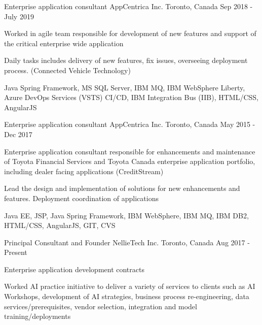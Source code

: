 \begin{cventries}


  \cventry
    {Enterprise application consultant}
    {AppCentrica Inc.}
    {Toronto, Canada}
    {Sep 2018 - July 2019}
    {
      \begin{cvitems}
      	\item{Worked in agile team responsible for development of new features and support of the critical enterprise wide application }
      	\item{ Daily tasks includes delivery of new features, fix issues, overseeing deployment process.  (Connected Vehicle Technology)}
       \item {Java Spring Framework, MS SQL Server, IBM MQ, IBM WebSphere Liberty, Azure DevOps Services (VSTS) CI/CD, IBM Integration Bus (IIB), HTML/CSS, AngularJS}
      \end{cvitems}
    }
    


  \cventry
    {Enterprise application consultant}
    {AppCentrica Inc.}
    {Toronto, Canada}
    {May 2015 - Dec 2017}
    {
      \begin{cvitems}
      	\item{Enterprise application consultant responsible for enhancements and maintenance of Toyota Financial Services and Toyota Canada enterprise application portfolio, including dealer facing applications (CreditStream)}
        \item {Lead the design and implementation of solutions for new enhancements and features. Deployment coordination of applications}
        \item {Java EE, JSP, Java Spring Framework, IBM WebSphere, IBM MQ, IBM DB2, HTML/CSS, AngularJS, GIT, CVS  }
      \end{cvitems}
    }

  \cventry
    {Principal Consultant and Founder}
    {NellieTech Inc.}
    {Toronto, Canada}
    {Aug 2017 - Present}
    {
      \begin{cvitems}
        \item{Enterprise application development contracts}
        \item{Worked AI practice initiative to deliver a variety of services to clients such as AI Workshops, development of AI strategies, business process re-engineering, data services/prerequisites, vendor selection, integration and model training/deployments}
      \end{cvitems}
    }
    

\end{cventries}
